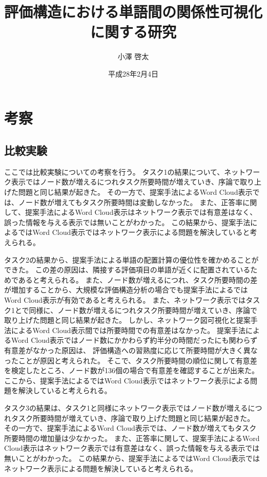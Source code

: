 \documentclass[syuuron]{kuee}
\title{評価構造における単語間の関係性可視化に関する研究}
\author{小澤 啓太}
\date{平成28年2月4日}
\begin{document}
\maketitle
\tableofcontents

			
\chapter{考察}
	\section{比較実験}
	ここでは比較実験についての考察を行う。
	タスク1の結果について、ネットワーク表示ではノード数が増えるにつれタスク所要時間が増えていき、序論で取り上げた問題と同じ結果が起きた。
	その一方で、提案手法によるWord Cloud表示では、ノード数が増えてもタスク所要時間は変動しなかった。
	また、正答率に関して、提案手法によるWord Cloud表示はネットワーク表示では有意差はなく、誤った情報を与える表示では無いことがわかった。
	この結果から、提案手法によるではWord Cloud表示ではネットワーク表示による問題を解決していると考えられる。
	
	タスク2の結果から、提案手法による単語の配置計算の優位性を確かめることができた。
	この差の原因は、隣接する評価項目の単語が近くに配置されているためであると考えられる。
	また、ノード数が増えるにつれ、タスク所要時間の差が増加することから、大規模な評価構造分析の場合でも提案手法によるではWord Cloud表示が有効であると考えられる。
	また、ネットワーク表示ではタスク1とで同様に、ノード数が増えるにつれタスク所要時間が増えていき、序論で取り上げた問題と同じ結果が起きた。
	しかし、ネットワーク図可視化と提案手法によるWord Cloud表示間では所要時間での有意差はなかった。
	提案手法によるWord Cloud表示ではノード数にかかわらず約半分の時間だったにも関わらず有意差がなかった原因は、
	評価構造への習熟度に応じて所要時間が大きく異なったことが原因と考えられた。
	そこで、タスク所要時間の順位に関して有意差を検定したところ、ノード数が136個の場合で有意差を確認することが出来た。
	ここから、提案手法によるではWord Cloud表示ではネットワーク表示による問題を解決していると考えられる。
	
	タスク3の結果は、タスク1と同様にネットワーク表示ではノード数が増えるにつれタスク所要時間が増えていき、序論で取り上げた問題と同じ結果が起きた。
	その一方で、提案手法によるWord Cloud表示では、ノード数が増えてもタスク所要時間の増加量は少なかった。
	また、正答率に関して、提案手法によるWord Cloud表示はネットワーク表示では有意差はなく、誤った情報を与える表示では無いことがわかった。
	この結果から、提案手法によるではWord Cloud表示ではネットワーク表示による問題を解決していると考えられる。
	
\end{document}
